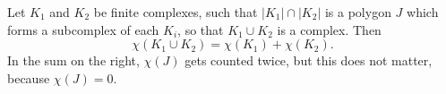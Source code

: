 Let $K_1$ and $K_2$ be finite complexes, such that $|K_1| \cap |K_2|$ is a polygon $J$ which forms a subcomplex of each $K_i$, so that $K_1 \cup K_2$ is a complex. Then
$$
\chi(K_1 \cup K_2) = \chi(K_1) + \chi(K_2).
$$
In the sum on the right, $\chi(J)$ gets counted twice, but this does not matter, because $\chi(J) = 0$.
